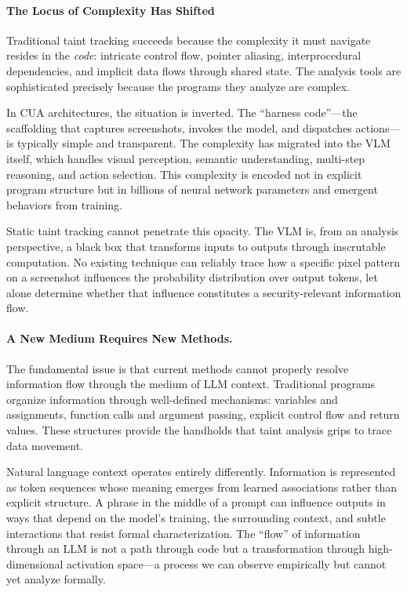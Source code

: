 \paragraph{The Locus of Complexity Has Shifted} Traditional taint tracking succeeds because the complexity it must navigate resides in the \emph{code}: intricate control flow, pointer aliasing, interprocedural dependencies, and implicit data flows through shared state. The analysis tools are sophisticated precisely because the programs they analyze are complex.

In CUA architectures, the situation is inverted. The ``harness code''---the scaffolding that captures screenshots, invokes the model, and dispatches actions---is typically simple and transparent. The complexity has migrated into the VLM itself, which handles visual perception, semantic understanding, multi-step reasoning, and action selection. This complexity is encoded not in explicit program structure but in billions of neural network parameters and emergent behaviors from training.

Static taint tracking cannot penetrate this opacity. The VLM is, from an analysis perspective, a black box that transforms inputs to outputs through inscrutable computation. No existing technique can reliably trace how a specific pixel pattern on a screenshot influences the probability distribution over output tokens, let alone determine whether that influence constitutes a security-relevant information flow.

\paragraph{A New Medium Requires New Methods.} The fundamental issue is that current methods cannot properly resolve information flow through the medium of LLM context. Traditional programs organize information through well-defined mechanisms: variables and assignments, function calls and argument passing, explicit control flow and return values. These structures provide the handholds that taint analysis grips to trace data movement.

Natural language context operates entirely differently. Information is represented as token sequences whose meaning emerges from learned associations rather than explicit structure. A phrase in the middle of a prompt can influence outputs in ways that depend on the model's training, the surrounding context, and subtle interactions that resist formal characterization. The ``flow'' of information through an LLM is not a path through code but a transformation through high-dimensional activation space---a process we can observe empirically but cannot yet analyze formally.

